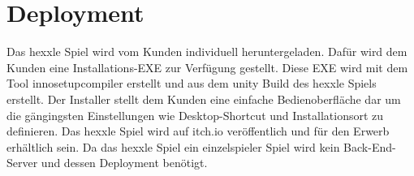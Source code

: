 \documentclass[../main.tex]{subfiles}
\begin{document}
	
	\section{Deployment}
	Das \gls{hexxle} Spiel wird vom Kunden individuell heruntergeladen. Dafür wird dem Kunden eine Installations-EXE zur Verfügung gestellt.
	Diese EXE wird mit dem Tool \gls{innosetupcompiler} erstellt und aus dem \gls{unity} Build des \gls{hexxle} Spiels erstellt.
	Der Installer stellt dem Kunden eine einfache Bedienoberfläche dar um die gängingsten Einstellungen wie Desktop-Shortcut und Installationsort zu definieren.
	Das \gls{hexxle} Spiel wird auf \gls{itch.io} veröffentlich und für den Erwerb erhältlich sein.
	Da das \gls{hexxle} Spiel ein einzelspieler Spiel wird kein Back-End-Server und dessen Deployment benötigt.
\end{document}
